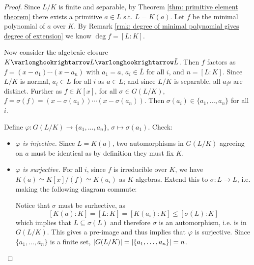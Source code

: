 \begin{proof}
    Since $L/K$ is finite and separable, by Theorem \ref{thm: primitive element theorem} there exists a primitive $a \in L$ s.t. $L = K(a)$. Let $f$ be the minimal polynomial of $a$ over $K$. By Remark \ref{rmk: degree of minimal polynomial gives degree of extension} we know $\deg f = [L : K]$.

    Now consider the algebraic closure $K \ext L \ext \bar{L}$. Then $f$ factors as $f = (x - a_1) \cdots (x - a_n)$ with $a_1 = a$, $a_i \in \bar{L}$ for all $i$, and $n = [L : K]$. Since $L/K$ is normal, $a_i \in L$ for all $i$ as $a \in L$; and since $L/K$ is separable, all $a_i$s are distinct. Further as $f \in K[x]$, for all $\sigma \in G(L/K)$, $f = \sigma(f) = (x - \sigma(a_1)) \cdots (x - \sigma(a_n))$. Then $\sigma(a_i) \in \{a_1, \dots, a_n\}$ for all $i$.

    Define $\varphi: G(L/K) \to \{a_1, \dots, a_n\}$, $\sigma \mapsto \sigma(a_1)$. Check:
    \begin{itemize}[label=$-$]
        \item \emph{$\varphi$ is injective.} Since $L = K(a)$, two automorphisms in $G(L/K)$ agreeing on $a$ must be identical as by definition they must fix $K$.
        \item \emph{$\varphi$ is surjective.} For all $i$, since $f$ is irreducible over $K$, we have $K(a) \simeq K[x]/(f) \simeq K(a_i)$ as $K$-algebras. Extend this to $\sigma: L \to L$, i.e. making the following diagram commute:

        \begin{minipage}{\linewidth}
            \centering
        \end{minipage}

        Notice that $\sigma$ must be surhective, as
        \[
            [K(a) : K] = [L : K] = [K(a_i) : K] \leq [\sigma(L) : K]
        \]
        which implies that $L \subseteq \sigma(L)$ and therefore $\sigma$ is an automorphism, i.e. is in $G(L/K)$. This gives a pre-image and thus implies that $\varphi$ is surjective. Since $\{a_1, \dots, a_n\}$ is a finite set, $\left|G(L/K)\right| = \left|\{a_1, \dots, a_n\}\right| = n$.
    \end{itemize}
\end{proof}

